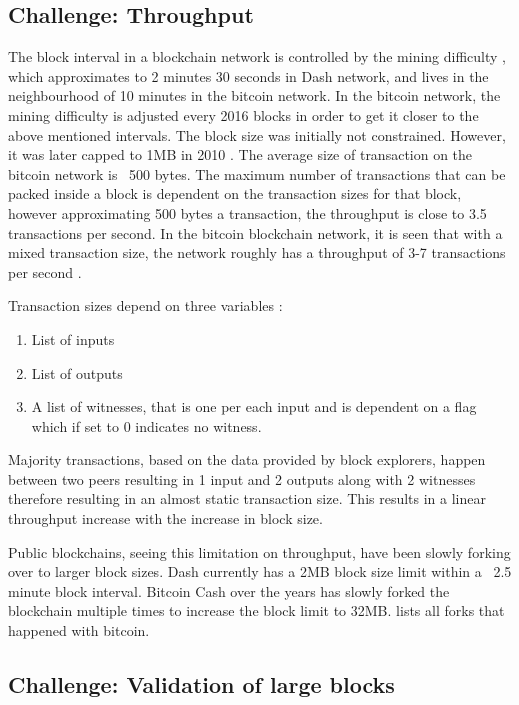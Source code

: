 \subsection{Challenge: Throughput}
The block interval \citep{interval} in a blockchain network is controlled by the
mining difficulty \citep{difficulty}, which approximates to 2 minutes 30 seconds in Dash network,
and lives in the neighbourhood of 10 minutes in the bitcoin network. In the bitcoin network, the mining
difficulty is adjusted every 2016 blocks in order to get it closer to the above
mentioned intervals. The block size was initially not constrained. However, it
was later capped to 1MB 
 in 2010 \cite{controversy}. The average size of transaction on the bitcoin
network is ~500 bytes. The maximum number of transactions that can be packed
inside a block is dependent on the transaction sizes for that block, however
approximating 500 bytes a transaction, the throughput is close to 3.5
transactions per second. In the bitcoin blockchain network, it is seen that
with a mixed transaction size, the network roughly has a throughput of 3-7 
transactions per second \citep{trees-not-chains}.

Transaction sizes depend on three variables :

\begin{enumerate}
    \item List of inputs
    \item List of outputs
    \item A list of witnesses, that is one per each input and is dependent on a
        flag which if set to 0 indicates no witness.
\end{enumerate}

Majority transactions, based on the data provided by block explorers, happen
between two peers resulting in 1 input and 2 outputs along with 2 witnesses
therefore resulting in an almost static transaction size. This results in a
linear throughput increase with the increase in block size.

Public blockchains, seeing this limitation on throughput, have been slowly
forking over to larger block sizes. Dash currently has a 2MB block size limit
within a ~2.5 minute block interval. Bitcoin Cash over the years has slowly forked the
blockchain multiple times to increase the block limit to 32MB. \citep{btc-forks} lists all forks that happened with bitcoin.


\subsection{Challenge: Validation of large blocks}

